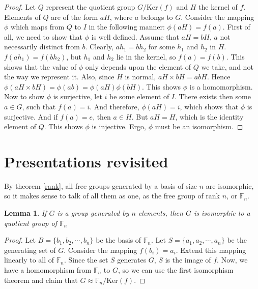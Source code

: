 \documentclass[12pt]{article}
\newtheorem{lem}[thm]{Lemma}
\theoremstyle{definition}
\begin{document}
\begin{proof}
Let $Q$ represent the quotient group $G/\mathrm{Ker}(f)$ and $H$ the kernel of $f$. Elements of $Q$ are of the form $aH$, where $a$ belongs to $G$. Consider the mapping $\phi$ which maps from $Q$ to $I$ in the following manner: $\phi(aH) = f(a)$. First of all, we need to show that $\phi$ is well defined. Assume that $aH=bH$, $a$ not necessarily distinct from $b$. Clearly, $ah_1=bh_2$ for some $h_1$ and $h_2$ in $H$. $f(ah_1)=f(bh_2)$, but $h_1$ and $h_2$ lie in the kernel, so $f(a)=f(b)$. This shows that the value of $\phi$ only depends upon the element of $Q$ we take, and not the way we represent it. Also, since $H$ is normal, $aH \times bH=abH$. Hence $\phi(aH \times bH) = \phi(ab) = \phi(aH)\phi(bH)$. This shows $\phi$ is a homomorphism. Now to show $\phi$ is surjective, let $i$ be some element of $I$. There exists then some $a \in G$, such that $f(a)=i$. And therefore, $\phi(aH)=i$, which shows that $\phi$ is surjective. And if $f(a)=e$, then $a \in H$. But $aH=H$, which is the identity element of $Q$. This shows $\phi$ is injective. Ergo, $\phi$ must be an isomorphism.
\end{proof}



\section{Presentations revisited}

By theorem \autoref{rank}, all free groups generated by a basis of size $n$ are isomorphic, so it makes sense to talk of all them as one, as the free group of rank $n$, or $\mathbb{F}_n$. 

\begin{lem}\cite{meier}\label{quotient}
If $G$ is a group generated by $n$ elements, then $G$ is isomorphic to a quotient group of $\mathbb{F}_n$
\end{lem}

\begin{proof}
Let $B= \{b_1, b_2, \cdots , b_n\}$ be the basis of $\mathbb{F}_n$. Let $S=\{a_1, a_2, \cdots, a_n\}$ be the generating set of $G$. Consider the mapping $f(b_i)=a_i$. Extend this mapping linearly to all of $\mathbb{F}_n$. Since the set $S$ generates $G$, $S$ is the image of $f$. Now, we have a homomorphism from $\mathbb{F}_n$ to $G$, so we can use the first isomorphism theorem and claim that $G \approx \mathbb{F}_n/\mathrm{Ker}(f)$. 
\end{proof}
\end{document}
